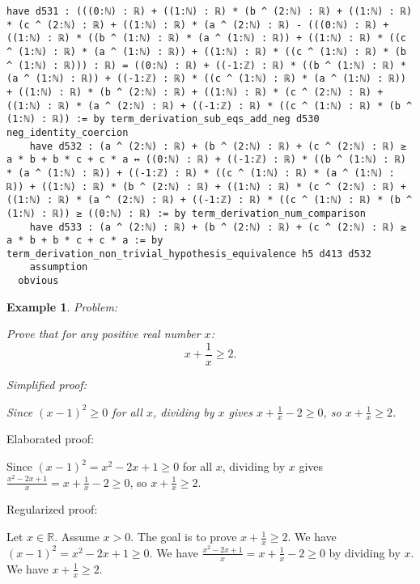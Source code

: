 \documentclass{article}
\newtheorem{example}{Example}
\begin{document}
\begin{tcolorbox}[colback=white!10, width=\linewidth]
\begin{lstlisting}[language=Lean4]
    have d531 : (((0:ℕ) : ℝ) + ((1:ℕ) : ℝ) * (b ^ (2:ℕ) : ℝ) + ((1:ℕ) : ℝ) * (c ^ (2:ℕ) : ℝ) + ((1:ℕ) : ℝ) * (a ^ (2:ℕ) : ℝ) - (((0:ℕ) : ℝ) + ((1:ℕ) : ℝ) * ((b ^ (1:ℕ) : ℝ) * (a ^ (1:ℕ) : ℝ)) + ((1:ℕ) : ℝ) * ((c ^ (1:ℕ) : ℝ) * (a ^ (1:ℕ) : ℝ)) + ((1:ℕ) : ℝ) * ((c ^ (1:ℕ) : ℝ) * (b ^ (1:ℕ) : ℝ))) : ℝ) = ((0:ℕ) : ℝ) + ((-1:ℤ) : ℝ) * ((b ^ (1:ℕ) : ℝ) * (a ^ (1:ℕ) : ℝ)) + ((-1:ℤ) : ℝ) * ((c ^ (1:ℕ) : ℝ) * (a ^ (1:ℕ) : ℝ)) + ((1:ℕ) : ℝ) * (b ^ (2:ℕ) : ℝ) + ((1:ℕ) : ℝ) * (c ^ (2:ℕ) : ℝ) + ((1:ℕ) : ℝ) * (a ^ (2:ℕ) : ℝ) + ((-1:ℤ) : ℝ) * ((c ^ (1:ℕ) : ℝ) * (b ^ (1:ℕ) : ℝ)) := by term_derivation_sub_eqs_add_neg d530 neg_identity_coercion
    have d532 : (a ^ (2:ℕ) : ℝ) + (b ^ (2:ℕ) : ℝ) + (c ^ (2:ℕ) : ℝ) ≥ a * b + b * c + c * a ↔ ((0:ℕ) : ℝ) + ((-1:ℤ) : ℝ) * ((b ^ (1:ℕ) : ℝ) * (a ^ (1:ℕ) : ℝ)) + ((-1:ℤ) : ℝ) * ((c ^ (1:ℕ) : ℝ) * (a ^ (1:ℕ) : ℝ)) + ((1:ℕ) : ℝ) * (b ^ (2:ℕ) : ℝ) + ((1:ℕ) : ℝ) * (c ^ (2:ℕ) : ℝ) + ((1:ℕ) : ℝ) * (a ^ (2:ℕ) : ℝ) + ((-1:ℤ) : ℝ) * ((c ^ (1:ℕ) : ℝ) * (b ^ (1:ℕ) : ℝ)) ≥ ((0:ℕ) : ℝ) := by term_derivation_num_comparison
    have d533 : (a ^ (2:ℕ) : ℝ) + (b ^ (2:ℕ) : ℝ) + (c ^ (2:ℕ) : ℝ) ≥ a * b + b * c + c * a := by term_derivation_non_trivial_hypothesis_equivalence h5 d413 d532
    assumption
  obvious

\end{lstlisting}
\end{tcolorbox}


\begin{example}
Problem:
\begin{tcolorbox}[colback=yellow!10, width=\linewidth]
Prove that for any positive real number $x$:
    $$x + \frac{1}{x} \geq 2.$$
\end{tcolorbox}

Simplified proof:
\begin{tcolorbox}[colback=blue!10, width=\linewidth]
Since $(x-1)^2 \ge 0$ for all $x$, dividing by $x$ gives $x + \frac{1}{x} - 2 \ge 0$, so $x + \frac{1}{x} \ge 2$.
\end{tcolorbox}
\end{example}

Elaborated proof:
\begin{tcolorbox}[colback=green!10, width=\linewidth]
Since $(x-1)^2 = x^2 - 2x + 1 \ge 0$ for all $x$, dividing by $x$ gives $\frac{x^2 - 2x + 1}{x} = x + \frac{1}{x} - 2 \ge 0$, so $x + \frac{1}{x} \ge 2$.
\end{tcolorbox}

Regularized proof:
\begin{tcolorbox}[colback=red!10, width=\linewidth]
Let $x\in\mathbb{R}$. Assume $x>0$.
The goal is to prove $x + \frac{1}{x} \ge 2$.
We have ${\left(x-1\right)}^2 = x^2 - 2x + 1 \ge 0$.
We have $\frac{x^2 - 2x + 1}{x} = x + \frac{1}{x} - 2 \ge 0$ by dividing by $x$.
We have $x + \frac{1}{x} \ge 2$.
\end{tcolorbox}
\end{document}
